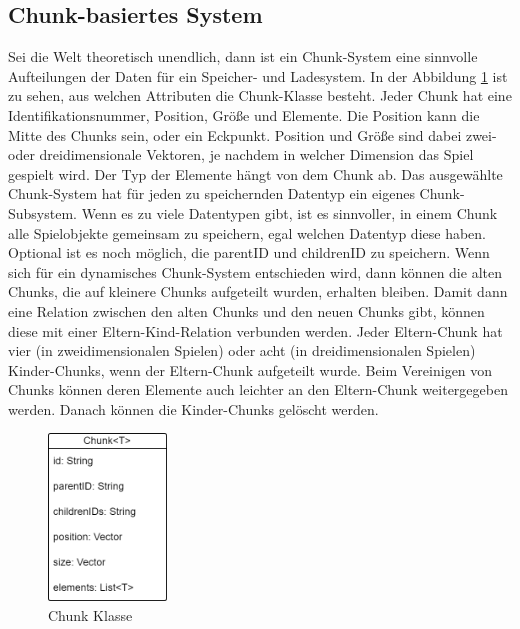 \subsection{Chunk-basiertes System}
Sei die Welt theoretisch unendlich, dann ist ein Chunk-System eine sinnvolle Aufteilungen der Daten für ein Speicher- und Ladesystem. In der Abbildung \ref{fig:chunkClass} ist zu sehen, aus welchen Attributen die Chunk-Klasse besteht. Jeder Chunk hat eine Identifikationsnummer, Position, Größe und Elemente. Die Position kann die Mitte des Chunks sein, oder ein Eckpunkt. Position und Größe sind dabei zwei- oder dreidimensionale Vektoren, je nachdem in welcher Dimension das Spiel gespielt wird. Der Typ der Elemente hängt von dem Chunk ab. Das ausgewählte Chunk-System hat für jeden zu speichernden Datentyp ein eigenes Chunk-Subsystem. Wenn es zu viele Datentypen gibt, ist es sinnvoller, in einem Chunk alle Spielobjekte gemeinsam zu speichern, egal welchen Datentyp diese haben. Optional ist es noch möglich, die parentID und childrenID zu speichern. Wenn sich für ein dynamisches Chunk-System entschieden wird, dann können die alten Chunks, die auf kleinere Chunks aufgeteilt wurden, erhalten bleiben. Damit dann eine Relation zwischen den alten Chunks und den neuen Chunks gibt, können diese mit einer Eltern-Kind-Relation verbunden werden. Jeder Eltern-Chunk hat vier (in zweidimensionalen Spielen) oder acht (in dreidimensionalen Spielen) Kinder-Chunks, wenn der Eltern-Chunk aufgeteilt wurde. Beim Vereinigen von Chunks können deren Elemente auch leichter an den Eltern-Chunk weitergegeben werden. Danach können die Kinder-Chunks gelöscht werden.

\begin{figure}[htp]
    \centering
    \includegraphics[width=0.28\textwidth]{images/Chunk.png}
    \caption{Chunk Klasse}
    \label{fig:chunkClass}
\end{figure}


